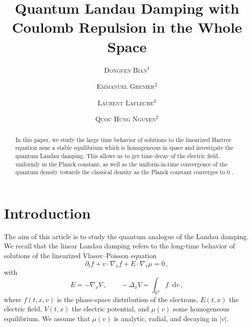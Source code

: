 \documentclass[a4paper,12pt]{amsart} %
\title[\textsc{Quantum Landau Damping}]{\Large Quantum Landau Damping with Coulomb Repulsion in the Whole Space}
\author[\textsc{D. Bian}]{\vspace{-0pt}\large\textsc{Dongfen Bian}$^1$}
\author[\textsc{E. Grenier}]{\vspace{-0pt}\large\textsc{Emmanuel Grenier}$^2$}
\author[\textsc{L. Lafleche}]{\vspace{-0pt}\large\textsc{Laurent Lafleche}$^3$}
\author[\textsc{Q.H. Nguyen}]{\vspace{-0pt}\large\textsc{Quoc Hung Nguyen}$^2$}
\theoremstyle{plain}
\theoremstyle{definition}
\newcommand		{\RR}		{\mathbb R}			%
\newcommand		{\R}		{\RR}
\newcommand		{\Rd}		{\R^3}
\newcommand		{\lt}			{\left}				%
\newcommand		{\rt}			{\right}			%
\renewcommand	{\(}			{\lt(}
\renewcommand	{\)}			{\rt)}
\newcommand		{\n}[1]			{\lt\lvert{#1}\rt\rvert}	%
\renewcommand		{\d}		{\mathop{}\!\mathrm{d}}		%
\newcommand			{\dpt}		{\partial_t}
\newcommand			{\Dx}		{\nabla_x}
\newcommand			{\Dv}		{\nabla_v}
\newcommand		{\intd}			{\int_{\Rd}}
\begin{document}
\begin{abstract}
	In this paper, we study the large time behavior of solutions to the linearized Hartree equation near a stable equilibrium which is homogeneous in space and investigate the quantum Landau damping.
	This allows us to get time decay of the electric field, uniformly in the Planck constant, as well as the uniform-in-time convergence of the quantum density towards the classical density as the Planck constant converges to $0$ .
\end{abstract}

\begingroup
\def\uppercasenonmath#1{} %
\let\MakeUppercase\relax %
\maketitle
\thispagestyle{empty} %
\endgroup


\bigskip











\section{Introduction}


	The aim of this article is to study the quantum analogue of the Landau damping. We recall that the linear Landau damping refers to the long-time behavior of solutions of the linearized Vlasov--Poisson equation
	\begin{equation}\label{eq:VP1}
		\dpt f + v \cdot \Dx f + E \cdot \Dv \mu = 0 \, ,
	\end{equation}
	with
	\begin{equation}\label{eq:VP2}
		E = - \nabla_x V\,, \qquad - \Delta_x V = \intd f \d v \, ,
	\end{equation}
	where $f(t,x,v)$ is the phase-space distribution of the electrons, $E(t,x)$ the electric field, $V(t,x)$ the electric potential, and $\mu(v)$ some homogeneous equilibrium. We assume that $\mu(v)$ is analytic, radial, and decaying in $\n{v}$. 
\end{document}
